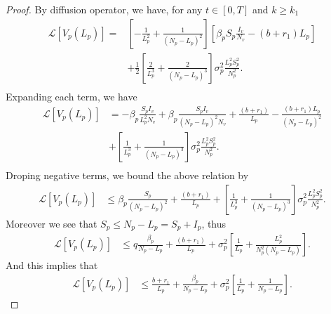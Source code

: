 \begin{proof}
	By diffusion operator, we have, for any $t\in [0,T]$ and $k\geq k_1$ 
%
	\begin{align*}
		\mathcal{L}[V_p(L_p)] 
			=&	
				\left[
					-\frac{1}{L_p^2} + 
					\frac{1}{(N_p - L_p) ^ 2}
				\right]
				\left[
					\beta_p S_p 
					\frac{I_v}{N_v} - 
					(b + r_1) L_p\right]
				\\
			&+
				\frac{1}{2}
				\left[
					\frac{2}{L_p^3} + 
					\frac{2}{(N_p - L_p)^3}
				\right]
				\sigma_p ^ 2
				\frac{L_p^2 S_p^2}{N_p^2}.
			\\
	\end{align*}
%	
	Expanding each term, we have
	\begin{align*}
		\mathcal{L}[V_p(L_p)] 
			&=	
				-\beta_p \frac{S_p I_v}{L_p^2 N_v} + 
				\beta_p \frac{S_p I_v}{(N_p -L_p) ^ 2 N_v} + 
				\frac{(b + r_1)}{L_p} - 
				\frac{(b+r_1)L_p}{(N_p-L_p)^2}
				\\
			&+
				\left[
					\frac{1}{L_p^3} + 
					\frac{1}{(N_p-L_p)^3}
				\right]
				\sigma_p ^ 2
				\frac{L_p^2 S_p^2}{N_p^2}.
				\\
	\end{align*}
%	
	Droping negative terms, we bound the above relation by
	\begin{align*}
		\mathcal{L}[V_p(L_p)] 
			&\leq	
				\beta_p 
				\frac{S_p}{(N_p - L_p) ^ 2} + 
				\frac{(b + r_1)}{L_p} + 
				\left[
					\frac{1}{L_p^3} + 
					\frac{1}{(N_p-L_p)^3}
				\right]
				\sigma_p ^ 2
				\frac{L_p ^ 2 S_p ^ 2}{N_p ^ 2}.
	\end{align*}
	Moreover we see that $S_p\leq N_p-L_p=S_p+I_p$, thus
	\begin{align*}
		\mathcal{L}[V_p(L_p)] 
			&\le q		
				\frac{\beta_p}{N_p -L_p} + 
				\frac{(b + r_1)}{L_p} + 
				\sigma_p^2
				\left[
					\frac{1}{L_p} + 
					\frac{L_p^2}{N_p^2(N_p-L_p)}
				\right].
	\end{align*}
	And this implies that
	\begin{align*}
		\mathcal{L}[V_p(L_p)] 
			&\leq		
			\frac{b+r_1}{L_p} + 
			\frac{\beta_p}{N_p -L_p} +  
			\sigma_p^2
			\left[
				\frac{1}{L_p} + 
				\frac{1}{N_p-L_p}
			\right].
	\end{align*}


\end{proof}
